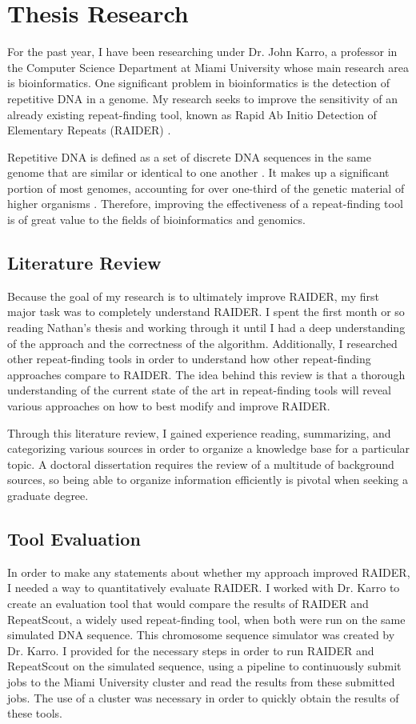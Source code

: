 \section{Thesis Research}
For the past year, I have been researching under Dr. John Karro, a professor in the Computer Science Department at Miami University whose main research area is bioinformatics. One significant problem in bioinformatics is the detection of repetitive DNA in a genome. My research seeks to improve the sensitivity of an already existing repeat-finding tool, known as Rapid Ab Initio Detection of Elementary Repeats (RAIDER) \cite{figueroa2013raiderpaper}.

Repetitive DNA is defined as a set of discrete DNA sequences in the same genome that are similar or identical to one another \cite{treangen2012repetitive}. It makes up a significant portion of most genomes, accounting for over one-third of the genetic material of higher organisms \cite{britten1968repeated}. Therefore, improving the effectiveness of a repeat-finding tool is of great value to the fields of bioinformatics and genomics.

\subsection{Literature Review}
Because the goal of my research is to ultimately improve RAIDER, my first major task was to completely understand RAIDER. I spent the first month or so reading Nathan's thesis and working through it until I had a deep understanding of the approach and the correctness of the algorithm.  Additionally, I researched other repeat-finding tools in order to understand how other repeat-finding approaches compare to RAIDER. The idea behind this review is that a thorough understanding of the current state of the art in repeat-finding tools will reveal various approaches on how to best modify and improve RAIDER.

Through this literature review, I gained experience reading, summarizing, and categorizing various sources in order to organize a knowledge base for a particular topic. A doctoral dissertation requires the review of a multitude of background sources, so being able to organize information efficiently is pivotal when seeking a graduate degree.

\subsection{Tool Evaluation}
In order to make any statements about whether my approach improved RAIDER, I needed a way to quantitatively evaluate RAIDER. I worked with Dr. Karro to create an evaluation tool that would compare the results of RAIDER and RepeatScout, a widely used repeat-finding tool, when both were run on the same simulated DNA sequence. This chromosome sequence simulator was created by Dr. Karro. I provided for the necessary steps in order to run RAIDER and RepeatScout on the simulated sequence, using a pipeline to continuously submit jobs to the Miami University cluster and read the results from these submitted jobs. The use of a cluster was necessary in order to quickly obtain the results of these tools.


